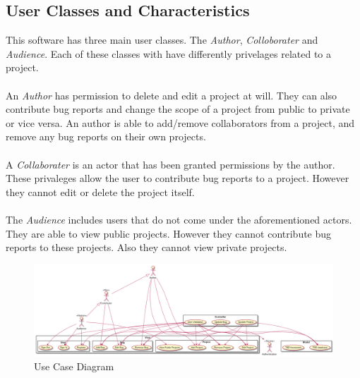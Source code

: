 \documentclass{article}
\newcommand{\comment}[1]{}
\begin{document}
\subsection{User Classes and Characteristics}\label{userClass}
\comment{
Identify the various user classes that you anticipate will use this product. User classes may be differentiated based on the frequency of use, subset of product functions used, technical expertise, security or privelege levels, educational level, or experience. Describe the pertinent characteristics of each user class. Certain requirements may pertain only to certain user classes. Distinguish the most import user classes for this product from those who are less important to satisfy.
}
This software has three main user classes. The \emph{Author}, \emph{Colloborater} and \emph{Audience}. Each of these classes with have differently privelages related to a project.
\\ \\
An \emph{Author} has permission to delete and edit a project at will. They can also contribute bug reports and change the scope of a project from public to private or vice versa. An author is able to add/remove collaborators from a project, and remove any bug reports on their own projects.
\\ \\
A \emph{Collaborater} is an actor that has been granted permissions by the author. These privaleges allow the user to contribute bug reports to a project. However they cannot edit or delete the project itself.
\\ \\
The \emph{Audience} includes users that do not come under the aforementioned actors. They are able to view public projects. However they cannot contribute bug reports to these projects. Also they cannot view private projects.
\begin{figure}[h]
\caption{ Use Case Diagram}
\centering
\includegraphics[width=\textwidth]{use-case-diagram.png}
\end{figure}
\end{document}
